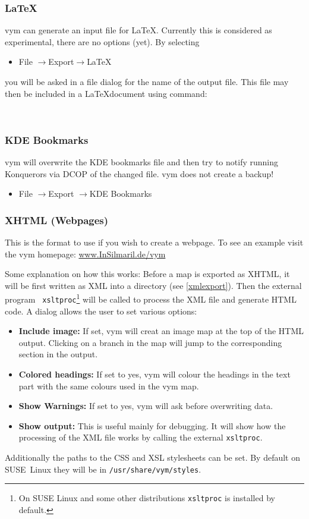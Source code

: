 \documentclass[12pt,a4paper]{article}
\newcommand{\vym}{{\sc vym }}
\newcommand{\ra}{$\longrightarrow$}
\begin{document}
\subsubsection*{\LaTeX}
\vym can generate an input file for \LaTeX. Currently this is considered
as experimental, there are no options (yet). 
By selecting
\begin{itemize}
    \item File  \ra Export\ra \LaTeX 
\end{itemize}
you will be asked in a file dialog for the name of the output file. This
file may then be included in a \LaTeX document using command: 
\begin{verbatim}
    
\end{verbatim}

\subsubsection*{KDE Bookmarks}
\vym will overwrite the KDE bookmarks file and then try to notify
running Konquerors via DCOP of the changed file. \vym does not create a
backup!
\begin{itemize}
    \item File \ra Export \ra KDE Bookmarks
\end{itemize}


\subsubsection*{XHTML (Webpages)}

This is the format to use if you wish to create a webpage. To see an example
visit the \vym homepage: 
\href{http://www.InSilmaril.de/vym}{www.InSilmaril.de/vym}

Some explanation on how this works: 
Before a map is exported as XHTML, it will be first written as XML into a
directory (see \ref{xmlexport}). Then the external program {\tt
xsltproc}\footnote{On SUSE Linux and some other distributions {\tt xsltproc} is installed by
default.}
will be called to process the XML file and generate HTML code.
A dialog allows the user to set various options:
\begin{itemize}
    \item {\bf Include image:} If set, \vym will creat an image map at
    the top of the HTML output. Clicking on a branch in the map will
    jump to the corresponding section in the output.

    \item {\bf Colored headings:}
    If set to yes, \vym will colour the headings in the text part  with the
    same colours used in the \vym map.
    \item {\bf Show Warnings:}
    If set to yes, \vym will ask before overwriting data.
    \item {\bf Show output:}
    This is useful mainly for debugging. It will show how the processing of
    the XML file works by calling the external {\tt xsltproc}.
\end{itemize}
Additionally the paths to the CSS and XSL stylesheets can be set. By
default on SUSE~Linux they will be in {\tt /usr/share/vym/styles}.
\end{document}

